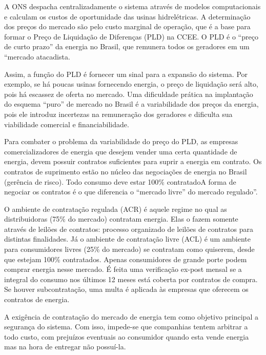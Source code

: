 A ONS despacha centralizadamente o sistema através de modelos computacionais
e calculam os custos de oportunidade das usinas hidrelétricas. A determinação
dos preços do mercado são pelo custo marginal de operação, que é a
base para formar o Preço de Liquidação de Diferenças (PLD) na CCEE.
O PLD é o \textquotedblleft preço de curto prazo\textquotedblright{}
da energia no Brasil, que remunera todos os geradores em um \textquotedblleft mercado
atacadista. 

Assim, a função do PLD é fornecer um sinal para a expansão do sistema.
Por exemplo, se há poucas usinas fornecendo energia, o preço de liquidação
será alto, pois há escassez de oferta no mercado. Uma dificuldade
prática na implantação do esquema \textquotedblleft puro\textquotedblright{}
de mercado no Brasil é a variabilidade dos preços da energia, pois
ele introduz incertezas na remuneração dos geradores e dificulta sua
viabilidade comercial e financiabilidade.

Para combater o problema da variabilidade do preço do PLD, as empresas
comercializadores de energia que desejem vender uma certa quantidade
de energia, devem possuir contratos suficientes para suprir a energia
em contrato. Os contratos de suprimento estão no núcleo das negociações
de energia no Brasil (gerência de risco). Todo consumo deve estar
100\% contratadoA forma de negociar os contratos é o que diferencia
o \textquotedblleft mercado livre\textquotedblright{} do mercado regulado\textquotedblright . 

O ambiente de contratação regulada (ACR) é aquele regime no qual as
distribuidoras (75\% do mercado) contratam energia. Elas o fazem somente
através de leilões de contratos: processo organizado de leilões de
contratos para distintas finalidades. Já o ambiente de contratação
livre (ACL) é um ambiente para consumidores livres (25\% do mercado)
se contratam como quiserem, desde que estejam 100\% contratados. Apenas
consumidores de grande porte podem comprar energia nesse mercado.
É feita uma verificação ex-post mensal se a integral do consumo nos
últimos 12 meses está coberta por contratos de compra. Se houver subcontratação,
uma multa é aplicada às empresas que oferecem os contratos de energia. 

A exigência de contratação do mercado de energia tem como objetivo
principal a segurança do sistema. Com isso, impede-se que companhias
tentem arbitrar a todo custo, com prejuízos eventuais ao consumidor
quando esta vende energia mas na hora de entregar não possuí-la.

